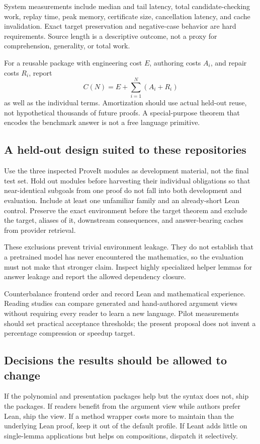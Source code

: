 \documentclass[11pt,letterpaper]{article}
\numberwithin{equation}{section}
\begin{document}
System measurements include median and tail latency, total candidate-checking
work, replay time, peak memory, certificate size, cancellation latency, and
cache invalidation. Exact target preservation and negative-case behavior are
hard requirements. Source length is a descriptive outcome, not a proxy for
comprehension, generality, or total work.

For a reusable package with engineering cost $E$, authoring costs $A_i$, and
repair costs $R_i$, report
\[
 C(N)=E+\sum_{i=1}^{N}(A_i+R_i)
\]
as well as the individual terms. Amortization should use actual held-out reuse,
not hypothetical thousands of future proofs. A special-purpose theorem that
encodes the benchmark answer is not a free language primitive.

\subsection{A held-out design suited to these repositories}
Use the three inspected ProveIt modules as development material, not the final
test set. Hold out modules before harvesting their individual obligations so that
near-identical subgoals from one proof do not fall into both development and
evaluation. Include at least one unfamiliar family and an already-short Lean
control. Preserve the exact environment before the target theorem and exclude
the target, aliases of it, downstream consequences, and answer-bearing caches
from provider retrieval.

These exclusions prevent trivial environment leakage. They do not establish that
a pretrained model has never encountered the mathematics, so the evaluation must
not make that stronger claim. Inspect highly specialized helper lemmas for
answer leakage and report the allowed dependency closure.

Counterbalance frontend order and record Lean and mathematical experience.
Reading studies can compare generated and hand-authored argument views without
requiring every reader to learn a new language. Pilot measurements should set
practical acceptance thresholds; the present proposal does not invent a
percentage compression or speedup target.

\subsection{Decisions the results should be allowed to change}
If the polynomial and presentation packages help but the syntax does not, ship
the packages. If readers benefit from the argument view while authors prefer
Lean, ship the view. If a method wrapper costs more to maintain than the
underlying Lean proof, keep it out of the default profile. If Leant adds little
on single-lemma applications but helps on compositions, dispatch it selectively.
\end{document}
